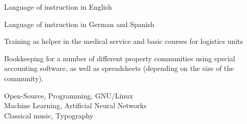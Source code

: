 \documentclass[12pt,a4paper,oneside,final]{scrartcl}
\begin{document}
\sepspace{}

{Language of instruction in English}

\sepspace{}

{Language of instruction in German and Spanish}



{
    Training as helper in the medical service and basic courses for logistics units
}

\sepspace{}

{
    Bookkeeping for a number of different property communities using special accounting software, as well as spreadsheets (depending on the size of the community).
}



Open-Source, Programming, GNU/Linux\\
Machine Learning, Artificial Neural Networks\\
Classical music, Typography
\end{document}
